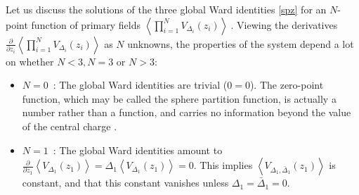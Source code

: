 \documentclass[12pt, a4paper, notitlepage, twoside]{report}
\numberwithin{equation}{section}
\theoremstyle{break}
\begin{document}
Let us discuss the solutions of the three global Ward identities \eqref{spz} for an $N$-point function of primary fields
$
\left\langle \prod_{i=1}^N V_{\Delta_i}(z_i) \right\rangle\ .
$
Viewing the derivatives $\frac{\partial}{\partial z_i}\left\langle \prod_{i=1}^N V_{\Delta_i}(z_i) \right\rangle$ as $N$ unknowns, the properties of the system depend a lot on whether $N<3, N=3$ or $N>3$:
\begin{itemize}
 \item $\boxed{N=0}$\ : The global Ward identities are trivial ($0=0$).
The zero-point function, which may be called the sphere partition function, is actually a number rather than a function, and carries no information beyond the value of the central charge \cite{car01}.

\item $\boxed{N=1}$\ :  The global Ward identities amount to $\frac{\partial}{\partial z_1}\left\langle V_{\Delta_1}(z_1)\right\rangle  =\Delta_1 \left\langle V_{\Delta_1}(z_1)\right\rangle =0$.
This implies $\left\langle V_{\Delta_1,\bar\Delta_1}(z_1)\right\rangle$ is constant, and that this constant vanishes unless $\Delta_1=\bar\Delta_1=0$.


\end{itemize}
\end{document}
